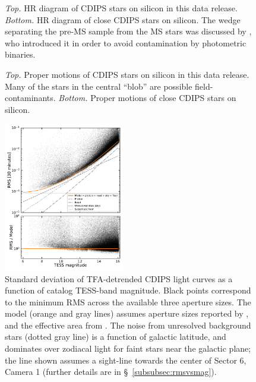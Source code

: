 \documentclass[12pt,twocolumn,tighten]{aastex62}
\begin{document}
\begin{figure}[!ht]
	\vspace{-0.8cm}
	\vspace{-0.8cm}
	\caption{
    {\it Top.} HR diagram of CDIPS stars on silicon in this data
    release.  {\it Bottom.} HR diagram of close CDIPS stars on
    silicon. The wedge separating the pre-MS sample from the MS stars
    was discussed by \citet{zari_3d_2018}, who introduced it in order
    to avoid contamination by photometric binaries.
	}
	\label{fig:hrd}
\end{figure}

\begin{figure}[!t]
	\vspace{-0.8cm}
	\vspace{-0.8cm}
	\caption{
		{\it Top.} Proper motions of CDIPS stars on silicon in this
		data release.  Many of the stars in the central ``blob'' are possible
		field-contaminants.
		{\it Bottom.} Proper motions of close CDIPS stars
		on silicon.
	}
	\label{fig:propermotions}
\end{figure}

\begin{figure}[!t]
	\begin{center}
		\leavevmode
		\includegraphics[width=0.47\textwidth]{rms_vs_mag.pdf}
	\end{center}
	\vspace{-0.5cm}
	\caption{
    Standard deviation of TFA-detrended CDIPS light curves as a
    function of catalog TESS-band magnitude.  Black points correspond
    to the minimum RMS across the available three aperture sizes.  The
    model (orange and gray lines) assumes aperture sizes reported by
    \citet{Sullivan_et_al_2015}, and the effective area from
    \citet{vanderspek_2018}.  The noise from unresolved background
    stars (dotted gray line) is a function of galactic latitude, and
    dominates over zodiacal light for faint stars near the galactic
    plane; the line shown assumes a sight-line towards the center of
    Sector 6, Camera 1 (further details are in
    \S~\ref{subsubsec:rmsvsmag}).
		\label{fig:rms_vs_mag}
	}
\end{figure}
\end{document}
